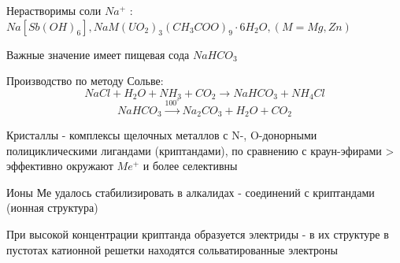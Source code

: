 Нерастворимы соли $Na^+$ : $Na[Sb(OH)_6], NaM(UO_2)_3(CH_3COO)_9\cdot 6H_2O, (M = Mg, Zn)$

Важные значение имеет пищевая сода $NaHCO_3$

Производство по методу Сольве:
$$NaCl + H_2O + NH_3 + CO_2 \rightarrow NaHCO_3 + NH_4Cl$$
$$NaHCO_3 \xrightarrow{100^{\circ}} Na_2CO_3 + H_2O + CO_2$$

Кристаллы - комплексы щелочных металлов с N-, O-донорными полициклическими лигандами (криптандами), по сравнению с краун-эфирами > эффективно окружают $Me^+$ и более селективны

Ионы Ме удалось стабилизировать в алкалидах - соединений с криптандами (ионная структура)

При высокой концентрации криптанда образуется электриды - в их структуре в пустотах катионной решетки находятся сольватированные электроны

